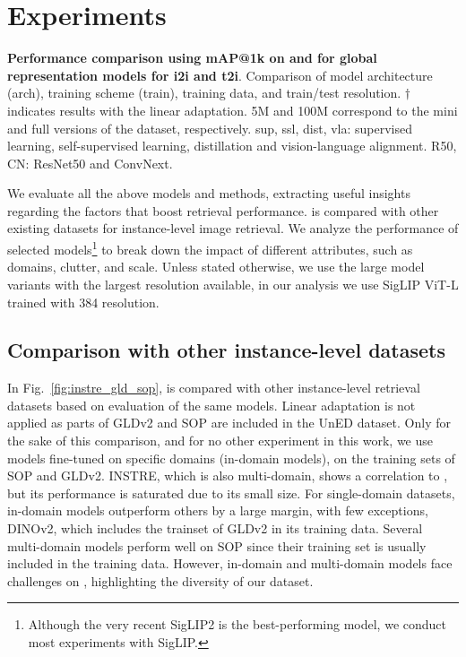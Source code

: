 \section{Experiments}
\label{sec:experiments}

\begin{table*}[t]
  \vspace{-10pt}
  \centering
  \scalebox{0.83}{
    
  }
  \vspace{-7pt}
  \caption{\textbf{Performance comparison using mAP@1k on \ours and \miniours for global representation models for i2i and t2i}. Comparison of model architecture (arch), training scheme (train), training data, and train/test resolution. $\dagger$ indicates results with the linear adaptation. 5M and 100M correspond to the mini and full versions of the dataset, respectively. sup, ssl, dist, vla: supervised learning, self-supervised learning, distillation and vision-language alignment. R50, CN: ResNet50 and ConvNext.
  \vspace{-15pt}
  \label{tab:foundational}
  }
\end{table*}

We evaluate all the above models and methods, extracting useful insights regarding the factors that boost retrieval performance. \ours is compared with other existing datasets for instance-level image retrieval. We analyze the performance of selected models\footnote{Although the very recent SigLIP2 is the best-performing model, we conduct most experiments with SigLIP.} to break down the impact of different \ours attributes, such as domains, clutter, and scale. Unless stated otherwise, we use the large model variants with the largest resolution available, \eg in our analysis we use SigLIP ViT-L trained with 384 resolution. 


\subsection{Comparison with other instance-level datasets}
\label{sec:comparison_datasets}

In Fig.~\ref{fig:instre_gld_sop}, \ours is compared with other instance-level retrieval datasets based on evaluation of the same models. Linear adaptation is not applied as parts of GLDv2 and SOP are included in the UnED dataset. 
Only for the sake of this comparison, and for no other experiment in this work, we use models fine-tuned on specific domains (in-domain models), \ie on the training sets of SOP and GLDv2.
INSTRE, which is also multi-domain, shows a correlation to \ours, but its performance is saturated due to its small size.
For single-domain datasets, in-domain models outperform others by a large margin, with few exceptions, \ie DINOv2, which includes the trainset of GLDv2 in its training data.
Several multi-domain models perform well on SOP since their training set is usually included in the training data. 
However, in-domain and multi-domain models face challenges on \ours, highlighting the diversity of our dataset.


